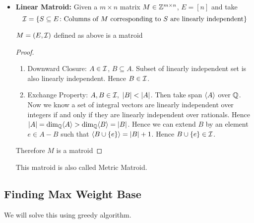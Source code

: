 \begin{itemize}[label=$\bullet$]
\item \textbf{Linear Matroid:} Given a $m\times n$ matrix $M\in \mathbb{Z}^{m\times n}$, $E=[n]$ and take $$\mathcal{I}=\{S\subseteq E\colon \text{Columns of $M$ corresponding to $S$ are linearly independent} \}$$
\begin{lemma}{}{}
	$M=(E,\mathcal{I})$ defined as above is a matroid
\end{lemma}
\begin{proof}
	\begin{enumerate}[label=\bfseries\tiny\protect\circled{\small\arabic*}]
		\item Downward Closure: $A\in \mathcal{I}$, $B\subseteq A$. Subset of linearly independent set is also linearly independent. Hence $B\in \mathcal{I}$. 
		\item Exchange Property: $A,B\in\mcI,\ |B|<|A|$. Then take span $\langle A\rangle$ over $\mathbb{Q}$. Now we know a set of integral vectors are linearly independent over integers if and only if they are linearly independent over rationals. Hence $|A|=\dim _{\mathbb{Q}}\langle A\rangle> \dim _{\mathbb{Q}}\langle B\rangle=|B|$. Hence we can extend $B$ by an element $e\in A-B$ such that $\langle B\cup \{e\}\rangle =|B|+1$. Hence $B\cup \{e\}\in \mathcal{I}$.
	\end{enumerate}Therefore $M$ is a matroid
\end{proof}
This matroid is also called Metric Matroid.
\end{itemize}
\subsection{Finding Max Weight Base}\label{matroid-max-weight-base}
\begin{algoprob}
\end{algoprob}

We will solve this using greedy algorithm.

